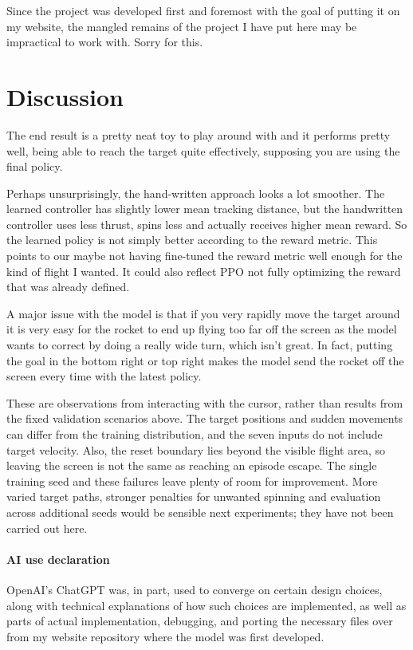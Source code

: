 \documentclass[12pt, letterpaper]{article}
\begin{document}
Since the project was developed first and 
foremost with 
the goal of putting it on my website, 
the mangled remains of the project I have put here 
may be impractical to work with. 
Sorry for this.  

\section{Discussion}

The end result is a pretty neat toy 
to play around with and it performs pretty well, 
being able to reach the target quite effectively, 
supposing you are using the final policy. 

Perhaps unsurprisingly, the hand-written approach looks
a lot smoother. The learned controller has slightly lower
mean tracking distance, but the handwritten controller uses
less thrust, spins less and actually receives higher mean reward.
So the learned policy is not simply better according to the
reward metric. This points to our maybe not having fine-tuned the
reward metric well enough for the kind of flight I wanted.
It could also reflect PPO not fully optimizing the reward
that was already defined.

A major issue with the model is that if you very 
rapidly move the target around it is very easy for 
the rocket to end up flying too far off the screen 
as the model wants to correct by doing a really 
wide turn, which isn't great.
In fact, putting the goal in the bottom right or 
top right 
makes the model send the rocket off the screen every time 
with the latest policy.  

These are observations from interacting with the cursor, rather
than results from the fixed validation scenarios above. The target
positions and sudden movements can differ from the training
distribution, and the seven inputs do not include target velocity.
Also, the reset boundary lies beyond the visible flight area, so
leaving the screen is not the same as reaching an episode escape.
The single training seed and these failures leave plenty of room
for improvement. More varied target paths, stronger penalties for
unwanted spinning and evaluation across additional seeds would
be sensible next experiments; they have not been carried out here.



\paragraph{AI use declaration}


OpenAI's ChatGPT was, in part, used to converge 
on certain design choices, along with technical 
explanations of how such choices are implemented, 
as well as parts of actual implementation, 
debugging, and porting the 
necessary files over from my website repository 
where the model was first developed. 
\end{document}
